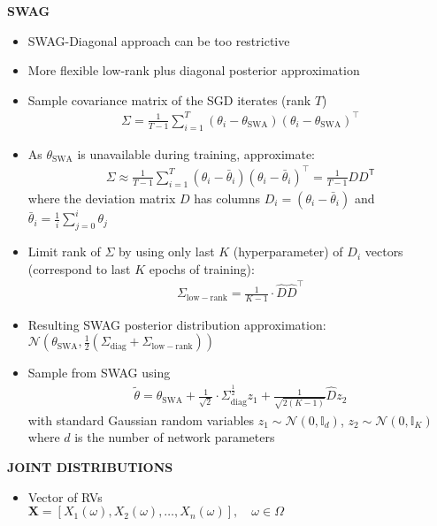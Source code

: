 \begin{whitebox}{\textbf{SWAG}}
    \begin{itemize}
        \item SWAG-Diagonal approach can be too restrictive
        \item More flexible low-rank plus diagonal posterior approximation
        \item Sample covariance matrix of the SGD iterates (rank $T$)
        \begin{align*}
            \Sigma={\frac{1}{T-1}}\sum_{i=1}^{T}(\theta_{i}-\theta_{\mathrm{SWA}})(\theta_{i}-\theta_{\mathrm{SWA}})^{\top}
        \end{align*}
        \item As $\theta_{\mathrm{SWA}}$ is unavailable during training, approximate:
        \begin{align*}
            \Sigma\approx{\frac{1}{T-1}}\sum_{i=1}^{T}(\theta_{i}-\bar{\theta}_{i})(\theta_{i}-\bar{\theta}_{i})^{\top}={\frac{1}{T-1}}D D^{\textsf{T}}
        \end{align*}
        where the deviation matrix $D$ has columns $D_i=(\theta_{i}-\bar{\theta}_{i})$ and $\bar{\theta}_{i}=\frac{1}{i}\sum_{j=0}^i\theta_j$
        \item Limit rank of $\Sigma$ by using only last $K$ (hyperparameter) of $D_i$ vectors (correspond to last $K$ epochs of training):
        \begin{align*}
            \Sigma_{\mathrm{low-rank}}={\frac{1}{K-1}}\cdot\hat{D}\hat{D}^{\top}
        \end{align*}
        \item Resulting SWAG posterior distribution approximation: ${\mathcal{N}}(\theta_{\mathrm{SWA}},\frac{1}{2}(\Sigma_{\mathrm{diag}}+\Sigma_{\mathrm{low-rank}}))$
        \item Sample from SWAG using
        \begin{align*}
            \tilde{\theta}=\theta_{\mathrm{SWA}}+\frac{1}{\sqrt{2}}\cdot\Sigma_{\mathrm{diag}}^{\frac{1}{2}}z_{1}+\frac{1}{\sqrt{2(K-1)}}\hat{D}z_{2}
        \end{align*}
        with standard Gaussian random variables $z_1\sim\mathcal{N}(0,\mathbb{I}_d)$, $z_2\sim\mathcal{N}(0,\mathbb{I}_K)$ where $d$ is the number of network parameters
    \end{itemize}
\end{whitebox}





\begin{whitebox}{\textbf{JOINT DISTRIBUTIONS}}
    \begin{itemize}
        \item Vector of RVs\\
        $\bm{X}=[X_1(\omega),X_2(\omega),\hdots,X_n(\omega)],\quad \omega\in\Omega$
    \end{itemize}
\end{whitebox}